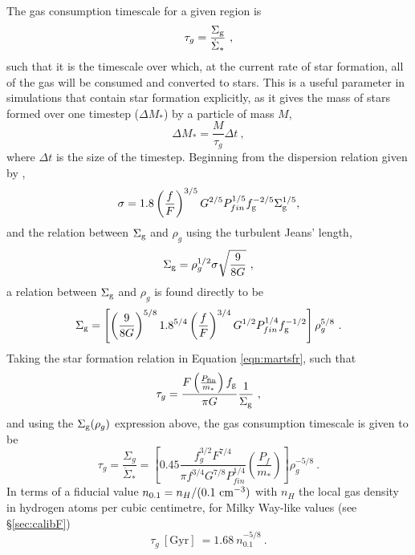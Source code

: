 The gas consumption timescale for a given region is
\begin{equation}
\label{eqn:gcdef}
\tau_g = \frac{\Sigma_\mathrm{g}}{\dot{\Sigma}_*}~,
\end{equation}
such that it is the timescale over which, at the current rate of star formation, all of the gas will be consumed and converted to stars.
This is a useful parameter in simulations that contain star formation explicitly, as it gives the mass of stars formed over one timestep ($\Delta M_*$) by a particle of mass $M$,
$$
\Delta M_* = \frac{M}{\tau_g} \Delta t~,
$$
where $\Delta t$ is the size of the timestep. Beginning from the dispersion relation given by \citet{martizzi_supernova_2015},
$$
\sigma = 1.8 \left(\frac{f}{F}\right)^{{3/5}} G^{{2/5}} P_{fin}^{{1/5}} f_\mathrm{g}^{{-2/5}} \Sigma_\mathrm{g}^{{1/5}},
$$
and the relation between $\Sigma_\mathrm{g}$ and $\rho_g$ using the turbulent Jeans' length,
$$
\Sigma_\mathrm{g} = \rho_g^{1/2} \sigma \sqrt{\frac{9}{8G}}~,
$$
a relation between $\Sigma_\mathrm{g}$ and $\rho_g$ is found directly to be
\begin{equation}
\label{eqn:sgrhog}
\Sigma_\mathrm{g} = \left[\left(\frac{9}{8G}\right)^{5/8} 1.8^{5/4} \left(\frac{f}{F}\right)^{3/4} G^{1/2} P_{fin}^{1/4} f_\mathrm{g}^{-1/2}\right] \rho_g^{5/8} ~.
\end{equation}
Taking the star formation relation in Equation \ref{eqn:martsfr}, such that
$$
\tau_g = \frac{F\left(\frac{P_\mathrm{fin}}{m_*}\right)f_\mathrm{g}}{\pi G} \frac{1}{\Sigma_\mathrm{g}}~,
$$
and using the $\Sigma_\mathrm{g} ( \rho_g )$ expression above, the gas consumption timescale is given to be
\begin{equation}
\label{eqn:gc}
\tau_{g} = \frac{\Sigma_g}{\dot{\Sigma}_*} = \left[0.45 \frac{f_g^{3/2} F^{7/4}}{\pi f^{3/4} G^{7/8} P_{fin}^{1/4}} \left(\frac{P_{f}}{m_*}\right)\right] \rho_g^{-5/8}~.
\end{equation}
In terms of a fiducial value $n_{0.1} = n_H/(0.1 ~\mathrm{cm}^{-3})$ with $n_H$ the local gas density in hydrogen atoms per cubic centimetre, for Milky Way-like values (see \S \ref{sec:calibF})
\begin{equation}
    \tau_{g} ~ [\mathrm{Gyr}] ~ = 1.68  ~ n_{0.1}^{-5/8}~.
\end{equation}

